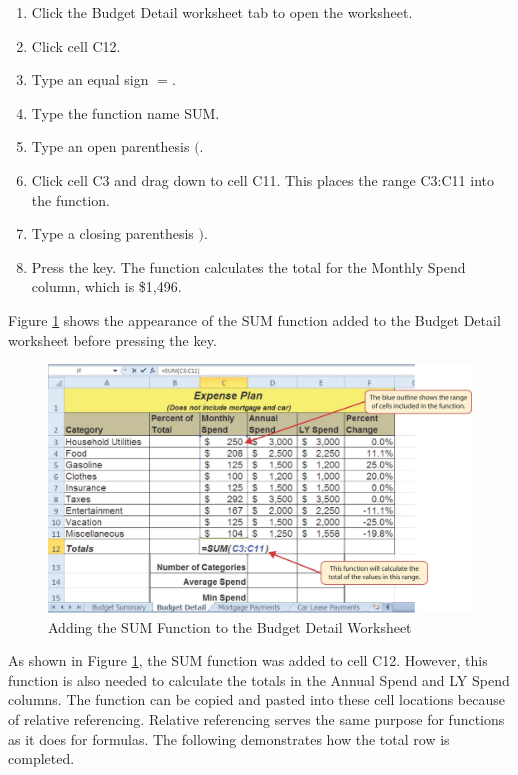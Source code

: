 \begin{enumerate}
	\item Click the Budget Detail worksheet tab to open the worksheet.
	\item Click cell \textsf{C12}.
	\item Type an equal sign $ = $.
	\item Type the function name SUM.
	\item Type an open parenthesis $ ( $.
	\item Click cell \textsf{C3} and drag down to cell \textsf{C11}. This places the range \textsf{C3:C11} into the function.
	\item Type a closing parenthesis $ ) $.
	\item Press the  key. The function calculates the total for the Monthly Spend column, which is \$1,496.
\end{enumerate}

Figure \ref{02:fig11} shows the appearance of the SUM function added to the Budget Detail worksheet before pressing the  key.

\begin{figure}[H]
	\centering
	\includegraphics[width=\maxwidth{.95\linewidth}]{gfx/ch02_fig11}
	\caption{Adding the SUM Function to the Budget Detail Worksheet}
	\label{02:fig11}
\end{figure}

As shown in Figure \ref{02:fig11}, the SUM function was added to cell \textsf{C12}. However, this function is also needed to calculate the totals in the Annual Spend and LY Spend columns. The function can be copied and pasted into these cell locations because of relative referencing. Relative referencing serves the same purpose for functions as it does for formulas. The following demonstrates how the total row is completed.

